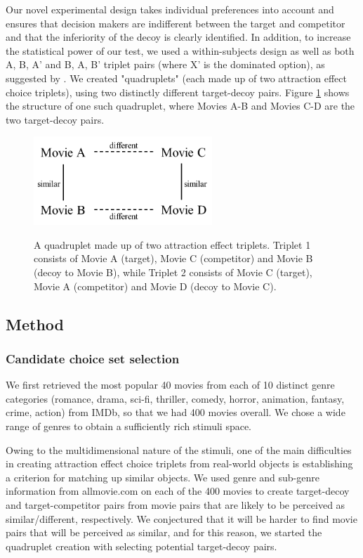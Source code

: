 \documentclass[12pt, a4paper]{article}
\begin{document}
Our novel experimental design takes individual preferences into account and ensures that decision makers are indifferent between the target and competitor and that the inferiority of the decoy is clearly identified. In addition, to increase the statistical power of our test, we used a within-subjects design as well as both A, B, A' and B, A, B' triplet pairs (where X' is the dominated option), as suggested by . We created "quadruplets" (each made up of two attraction effect choice triplets), using two distinctly different target-decoy pairs. Figure \ref{fig:quadruplets} shows the structure of one such quadruplet, where Movies A-B and Movies C-D are the two target-decoy pairs.


 \begin{figure}
\centering
\captionsetup{justification=centering}
\caption{A quadruplet made up of two attraction effect triplets. Triplet 1 consists of Movie A (target), Movie C (competitor) and Movie B (decoy to Movie B), while Triplet 2 consists of Movie C (target), Movie A (competitor) and Movie D (decoy to Movie C).}
\includegraphics[width=0.6\textwidth]{quadruplets.png}
\label{fig:quadruplets}
\end{figure}

\subsection{Method}

\subsubsection{Candidate choice set selection}

We first retrieved the most popular 40 movies from each of 10 distinct genre categories (romance, drama, sci-fi, thriller, comedy, horror, animation, fantasy, crime, action) from IMDb, so that we had 400 movies overall. We chose a wide range of genres to obtain a sufficiently rich stimuli space. 

Owing to the multidimensional nature of the stimuli, one of the main difficulties in creating attraction effect choice triplets from real-world objects is establishing a criterion for matching up similar objects. We used genre and sub-genre information from allmovie.com on each of the 400 movies to create target-decoy and target-competitor pairs from movie pairs that are likely to be perceived as similar/different, respectively. We conjectured that it will be harder to find movie pairs that will be perceived as similar, and for this reason, we started the quadruplet creation with selecting potential target-decoy pairs.
\end{document}
